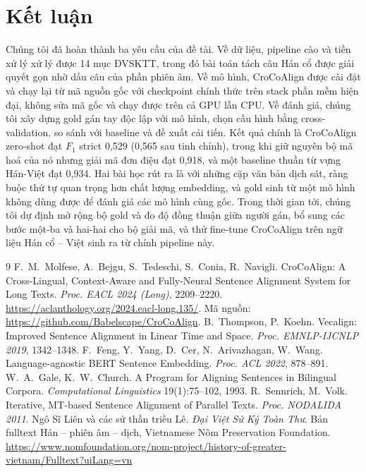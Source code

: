 \documentclass[11pt,a4paper]{article}
\newcommand{\croco}{CroCoAlign}
\begin{document}
\section{Kết luận}
Chúng tôi đã hoàn thành ba yêu cầu của đề tài. Về dữ liệu, pipeline cào và tiền xử lý xử lý được 14 mục ĐVSKTT, trong
đó bài toán tách câu Hán cổ được giải quyết gọn nhờ dấu câu của phần phiên âm. Về mô hình, \croco{} được cài đặt và
chạy lại từ mã nguồn gốc với checkpoint chính thức trên stack phần mềm hiện đại, không sửa mã gốc và chạy được trên cả
GPU lẫn CPU. Về đánh giá, chúng tôi xây dựng gold gán tay độc lập với mô hình, chọn cấu hình bằng cross-validation, so
sánh với baseline và đề xuất cải tiến. Kết quả chính là \croco{} zero-shot đạt $F_1$ strict 0,529 (0,565 sau tinh
chỉnh), trong khi giữ nguyên bộ mã hoá của nó nhưng giải mã đơn điệu đạt 0,918, và một baseline thuần từ vựng Hán-Việt
đạt 0,934. Hai bài học rút ra là với những cặp văn bản dịch sát, ràng buộc thứ tự quan trọng hơn chất lượng embedding,
và gold sinh từ một mô hình không dùng được để đánh giá các mô hình cùng gốc. Trong thời gian tới, chúng tôi dự định mở
rộng bộ gold và đo độ đồng thuận giữa người gán, bổ sung các bước một-ba và hai-hai cho bộ giải mã, và thử fine-tune
\croco{} trên ngữ liệu Hán cổ -- Việt sinh ra từ chính pipeline này.

\begin{thebibliography}{9}\small
{} F.~M.~Molfese, A.~Bejgu, S.~Tedeschi, S.~Conia, R.~Navigli. CroCoAlign: A Cross-Lingual,
  Context-Aware and Fully-Neural Sentence Alignment System for Long Texts. \emph{Proc. EACL 2024 (Long)}, 2209--2220.
  \url{https://aclanthology.org/2024.eacl-long.135/}. Mã nguồn: \url{https://github.com/Babelscape/CroCoAlign}.
 B.~Thompson, P.~Koehn. Vecalign: Improved Sentence Alignment in Linear Time and Space.
  \emph{Proc. EMNLP-IJCNLP 2019}, 1342--1348.
 F.~Feng, Y.~Yang, D.~Cer, N.~Arivazhagan, W.~Wang. Language-agnostic BERT Sentence Embedding.
  \emph{Proc. ACL 2022}, 878--891.
 W.~A.~Gale, K.~W.~Church. A Program for Aligning Sentences in Bilingual Corpora.
  \emph{Computational Linguistics} 19(1):75--102, 1993.
 R.~Sennrich, M.~Volk. Iterative, MT-based Sentence Alignment of Parallel Texts.
  \emph{Proc. NODALIDA 2011}.
 Ngô Sĩ Liên và các sử thần triều Lê. \emph{Đại Việt Sử Ký Toàn Thư}. Bản fulltext Hán -- phiên âm --
  dịch, Vietnamese Nôm Preservation Foundation.
  \url{https://www.nomfoundation.org/nom-project/history-of-greater-vietnam/Fulltext?uiLang=vn}
\end{thebibliography}
\end{document}
